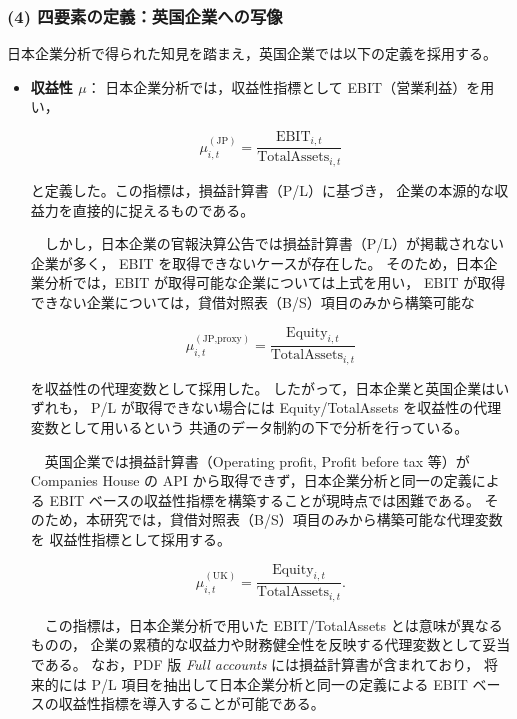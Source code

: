 \subsubsection{(4) 四要素の定義：英国企業への写像}

日本企業分析で得られた知見を踏まえ，英国企業では以下の定義を採用する。

\begin{itemize}
\item \textbf{収益性 $\mu$}：  
日本企業分析では，収益性指標として EBIT（営業利益）を用い，



\[
\mu_{i,t}^{(\text{JP})}
= \frac{\text{EBIT}_{i,t}}{\text{TotalAssets}_{i,t}}
\]



と定義した。この指標は，損益計算書（P/L）に基づき，
企業の本源的な収益力を直接的に捉えるものである。

　しかし，日本企業の官報決算公告では損益計算書（P/L）が掲載されない企業が多く，
EBIT を取得できないケースが存在した。
そのため，日本企業分析では，EBIT が取得可能な企業については上式を用い，
EBIT が取得できない企業については，貸借対照表（B/S）項目のみから構築可能な



\[
\mu_{i,t}^{(\text{JP,proxy})}
= \frac{\text{Equity}_{i,t}}{\text{TotalAssets}_{i,t}}
\]



を収益性の代理変数として採用した。
したがって，日本企業と英国企業はいずれも，
P/L が取得できない場合には Equity/TotalAssets を収益性の代理変数として用いるという
共通のデータ制約の下で分析を行っている。

　英国企業では損益計算書（Operating profit, Profit before tax 等）が
Companies House の API から取得できず，日本企業分析と同一の定義による
EBIT ベースの収益性指標を構築することが現時点では困難である。
そのため，本研究では，貸借対照表（B/S）項目のみから構築可能な代理変数を
収益性指標として採用する。



\[
\mu_{i,t}^{(\text{UK})}
= \frac{\text{Equity}_{i,t}}{\text{TotalAssets}_{i,t}}.
\]



　この指標は，日本企業分析で用いた EBIT/TotalAssets とは意味が異なるものの，
企業の累積的な収益力や財務健全性を反映する代理変数として妥当である。
なお，PDF 版 \textit{Full accounts} には損益計算書が含まれており，
将来的には P/L 項目を抽出して日本企業分析と同一の定義による
EBIT ベースの収益性指標を導入することが可能である。


\end{itemize}
